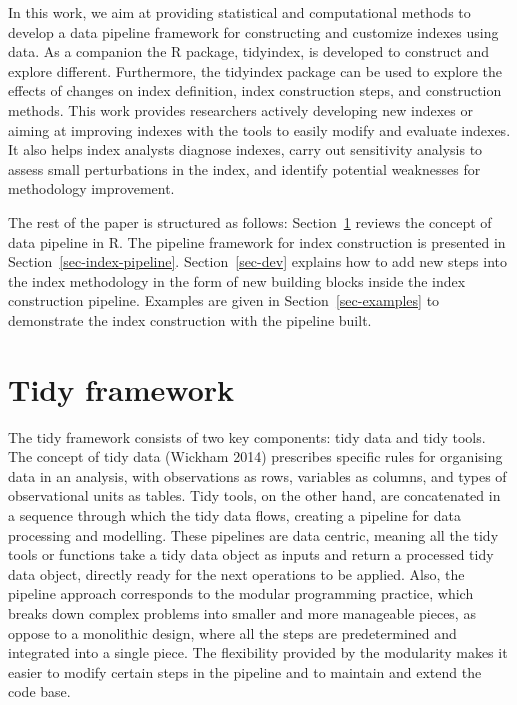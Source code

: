 \documentclass[
]{interact}
\begin{document}
In this work, we aim at providing statistical and computational methods
to develop a data pipeline framework for constructing and customize
indexes using data. As a companion the R package, tidyindex, is
developed to construct and explore different. Furthermore, the tidyindex
package can be used to explore the effects of changes on index
definition, index construction steps, and construction methods. This
work provides researchers actively developing new indexes or aiming at
improving indexes with the tools to easily modify and evaluate indexes.
It also helps index analysts diagnose indexes, carry out sensitivity
analysis to assess small perturbations in the index, and identify
potential weaknesses for methodology improvement.

The rest of the paper is structured as follows:
Section~\ref{sec-pipeline} reviews the concept of data pipeline in R.
The pipeline framework for index construction is presented in
Section~\ref{sec-index-pipeline}. Section~\ref{sec-dev} explains how to
add new steps into the index methodology in the form of new building
blocks inside the index construction pipeline. Examples are given in
Section~\ref{sec-examples} to demonstrate the index construction with
the pipeline built.

\hypertarget{sec-pipeline}{%
\section{Tidy framework}\label{sec-pipeline}}

The tidy framework consists of two key components: tidy data and tidy
tools. The concept of tidy data (Wickham 2014) prescribes specific rules
for organising data in an analysis, with observations as rows, variables
as columns, and types of observational units as tables. Tidy tools, on
the other hand, are concatenated in a sequence through which the tidy
data flows, creating a pipeline for data processing and modelling. These
pipelines are data centric, meaning all the tidy tools or functions take
a tidy data object as inputs and return a processed tidy data object,
directly ready for the next operations to be applied. Also, the pipeline
approach corresponds to the modular programming practice, which breaks
down complex problems into smaller and more manageable pieces, as oppose
to a monolithic design, where all the steps are predetermined and
integrated into a single piece. The flexibility provided by the
modularity makes it easier to modify certain steps in the pipeline and
to maintain and extend the code base.
\end{document}
